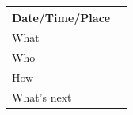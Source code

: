 \documentclass{article}
\begin{document}
\begin{table}[H]
\begin{tabular}{|p{1.5in}|p{4in}|}
\hline
Date/Time/Place &  \\ \hline
What            &  \\ \hline
Who             &  \\ \hline
How             &  \\ \hline
What's next     &  \\ \hline
\end{tabular}
\end{table}
\end{document}
